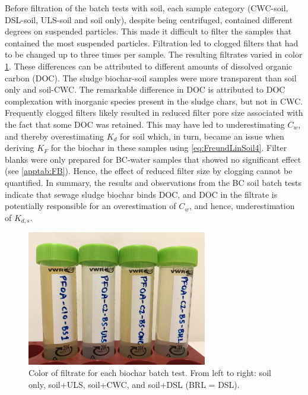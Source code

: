 Before filtration of the batch tests with soil, each sample category (CWC-soil, DSL-soil, ULS-soil and soil only), despite being centrifuged, contained different degrees on suspended particles. This made it difficult to filter the samples that contained the most suspended particles. Filtration led to clogged filters that had to be changed up to three times per sample. The resulting filtrates varied in color \cref{fig:DOC}. These differences can be attributed to different amounts of dissolved organic carbon (DOC). The sludge biochar-soil samples were more transparent than soil only and soil-CWC. The remarkable difference in DOC is attributed to DOC complexation with inorganic species present in the sludge chars, but not in CWC. Frequently clogged filters likely resulted in reduced filter pore size associated with the fact that some DOC was retained. This may have led to underestimating $C_w$, and thereby overestimating $K_d$ for soil which, in turn, became an issue when deriving $K_F$ for the biochar in these samples using \cref{eq:FreundLinSoil4}. Filter blanks were only prepared for BC-water samples that showed no significant effect (see \cref{apptab:FB}). Hence, the effect of reduced filter size by clogging cannot be quantified. In summary, the results and observations from the BC soil batch tests indicate that sewage sludge biochar binds DOC, and DOC in the filtrate is potentially responsible for an overestimation of $C_w$, and hence, underestimation of $K_{d,s}$. 

\begin{figure}
    \centering
    \includegraphics[width=0.7\textwidth]{Bilder/Samples/Filtrate_DOC.JPG}
    \caption{Color of filtrate for each biochar batch test. From left to right: soil only, soil+ULS, soil+CWC, and soil+DSL (BRL = DSL).}
    \label{fig:DOC}
\end{figure}

